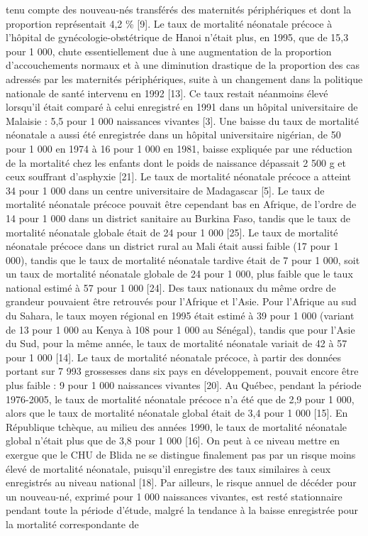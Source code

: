 \documentclass[
]{book}
\begin{document}
tenu compte des nouveau-nés transférés des maternités
périphériques et dont la proportion représentait 4,2 \% {[}9{]}.
Le taux de mortalité néonatale précoce à l'hôpital de
gynécologie-obstétrique de Hanoi n'était plus, en 1995, que
de 15,3 pour 1 000, chute essentiellement due à une
augmentation de la proportion d'accouchements normaux
et à une diminution drastique de la proportion des cas
adressés par les maternités périphériques, suite à un
changement dans la politique nationale de santé intervenu
en 1992 {[}13{]}. Ce taux restait néanmoins élevé lorsqu'il était
comparé à celui enregistré en 1991 dans un hôpital
universitaire de Malaisie : 5,5 pour 1 000 naissances
vivantes {[}3{]}. Une baisse du taux de mortalité néonatale a
aussi été enregistrée dans un hôpital universitaire nigérian, de
50 pour 1 000 en 1974 à 16 pour 1 000 en 1981, baisse
expliquée par une réduction de la mortalité chez les enfants
dont le poids de naissance dépassait 2 500 g et ceux
souffrant d'asphyxie {[}21{]}. Le taux de mortalité néonatale
précoce a atteint 34 pour 1 000 dans un centre universitaire
de Madagascar {[}5{]}.
Le taux de mortalité néonatale précoce pouvait être
cependant bas en Afrique, de l'ordre de 14 pour 1 000 dans
un district sanitaire au Burkina Faso, tandis que le taux de
mortalité néonatale globale était de 24 pour 1 000 {[}25{]}.
Le taux de mortalité néonatale précoce dans un district
rural au Mali était aussi faible (17 pour 1 000), tandis que le
taux de mortalité néonatale tardive était de 7 pour 1 000, soit
un taux de mortalité néonatale globale de 24 pour 1 000, plus
faible que le taux national estimé à 57 pour 1 000 {[}24{]}.
Des taux nationaux du même ordre de grandeur pouvaient
être retrouvés pour l'Afrique et l'Asie. Pour l'Afrique au sud
du Sahara, le taux moyen régional en 1995 était estimé à
39 pour 1 000 (variant de 13 pour 1 000 au Kenya à 108 pour
1 000 au Sénégal), tandis que pour l'Asie du Sud, pour la
même année, le taux de mortalité néonatale variait de 42 à
57 pour 1 000 {[}14{]}.
Le taux de mortalité néonatale précoce, à partir des
données portant sur 7 993 grossesses dans six pays en
développement, pouvait encore être plus faible : 9 pour
1 000 naissances vivantes {[}20{]}. Au Québec, pendant la
période 1976-2005, le taux de mortalité néonatale précoce
n'a été que de 2,9 pour 1 000, alors que le taux de mortalité
néonatale global était de 3,4 pour 1 000 {[}15{]}. En République
tchèque, au milieu des années 1990, le taux de mortalité
néonatale global n'était plus que de 3,8 pour 1 000 {[}16{]}.
On peut à ce niveau mettre en exergue que le CHU de
Blida ne se distingue finalement pas par un risque moins
élevé de mortalité néonatale, puisqu'il enregistre des taux
similaires à ceux enregistrés au niveau national {[}18{]}. Par
ailleurs, le risque annuel de décéder pour un nouveau-né,
exprimé pour 1 000 naissances vivantes, est resté stationnaire
pendant toute la période d'étude, malgré la tendance à la
baisse enregistrée pour la mortalité correspondante de
\end{document}

